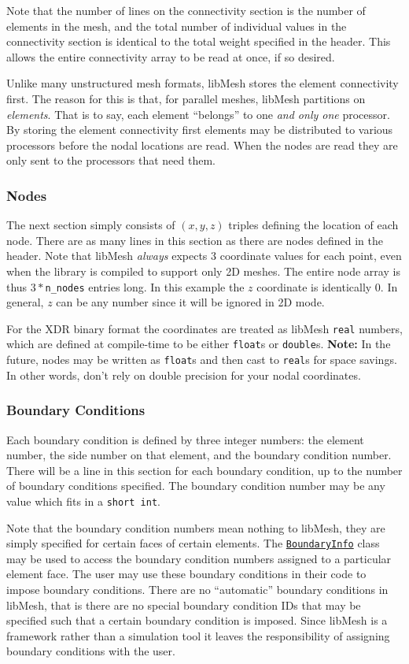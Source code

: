 \documentclass[12pt]{article}
\begin{document}
Note that the number of lines on the connectivity section is the number of elements in the mesh, and the total number of individual values in the connectivity section is identical to the total weight specified in the header.  This allows the entire connectivity array to be read at once, if so desired.

Unlike many unstructured mesh formats, libMesh stores the element connectivity first.  The reason for this is that, for parallel meshes, libMesh partitions on \emph{elements}.  That is to say, each element ``belongs'' to one \emph{and only one} processor.  By storing the element connectivity first elements may be distributed to various processors before the nodal locations are read.  When the nodes are read they are only sent to the processors that need them.

\subsubsection{Nodes}
The next section simply consists of $(x,y,z)$ triples defining the location of each node.  There are as many lines in this section as there are nodes defined in the header.  Note that libMesh \emph{always} expects 3 coordinate values for each point, even when the library is compiled to support only 2D meshes. The entire node array is thus $3*$\texttt{n\_nodes} entries long.  In this example the $z$ coordinate is identically 0.  In general, $z$ can be any number since it will be ignored in 2D mode.

For the XDR binary format the coordinates are treated as libMesh \texttt{real} numbers, which are defined at compile-time to be either \texttt{float}s or \texttt{double}s.  \textbf{Note:} In the future, nodes may be written as \texttt{float}s and then cast to \texttt{real}s for space savings.  In other words, don't rely on double precision for your nodal coordinates.

\subsubsection{Boundary Conditions}
Each boundary condition is defined by three integer numbers:  the element number, the side number on that element, and the boundary condition number.  There will be a line in this section for each boundary condition, up to the number of boundary conditions specified.  The boundary condition number may be any value which fits in a \texttt{short int}.

Note that the boundary condition numbers mean nothing to libMesh, they are simply specified for certain faces of certain elements.  The \href{http://libmesh.sourceforge.net/doxygen/classBoundaryInfo.html}{\texttt{BoundaryInfo}} class may be used to access the boundary condition numbers assigned to a particular element face.  The user may use these boundary conditions in their code to impose boundary conditions.  There are no ``automatic'' boundary conditions in libMesh, that is there are no special boundary condition IDs that may be specified such that a certain boundary condition is imposed.  Since libMesh is a framework rather than a simulation tool it leaves the responsibility of assigning boundary conditions with the user.
\end{document}

